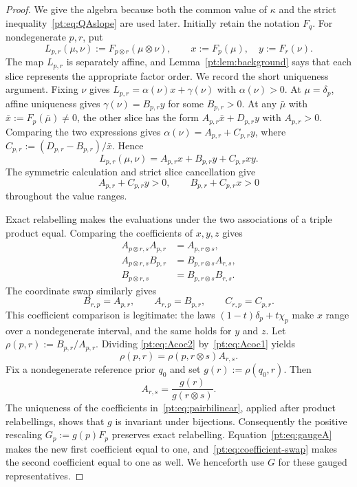 \begin{proof}
We give the algebra because both the common value of $\kappa$ and the strict
inequality~\eqref{pt:eq:QAslope} are used later.  Initially retain the notation
$F_q$.  For nondegenerate $p,r$, put
\[
 L_{p,r}(\mu,\nu):=F_{p\otimes r}(\mu\otimes\nu),
 \qquad x:=F_p(\mu),\quad y:=F_r(\nu).
\]
The map $L_{p,r}$ is separately affine, and
Lemma~\ref{pt:lem:background} says that each slice represents the appropriate
factor order.  We record the short uniqueness argument.  Fixing $\nu$ gives
$L_{p,r}=\alpha(\nu)x+\gamma(\nu)$ with $\alpha(\nu)>0$.  At
$\mu=\delta_p$, affine uniqueness gives
$\gamma(\nu)=B_{p,r}y$ for some $B_{p,r}>0$.  At any $\bar\mu$ with
$\bar x:=F_p(\bar\mu)\ne0$, the other slice has the form
$A_{p,r}\bar x+D_{p,r}y$ with $A_{p,r}>0$.  Comparing the two expressions
gives $\alpha(\nu)=A_{p,r}+C_{p,r}y$, where
$C_{p,r}:=(D_{p,r}-B_{p,r})/\bar x$.  Hence
\begin{equation}
 L_{p,r}(\mu,\nu)
 =A_{p,r}x+B_{p,r}y+C_{p,r}xy.
\label{pt:eq:pairbilinear}
\end{equation}
The symmetric calculation and strict slice cancellation give
\begin{equation}
 A_{p,r}+C_{p,r}y>0,
 \qquad B_{p,r}+C_{p,r}x>0
\label{pt:eq:pair-slopes}
\end{equation}
throughout the value ranges.

Exact relabelling makes the evaluations under the two associations of a
triple product equal.  Comparing the coefficients of $x,y,z$ gives
\begin{align}
 A_{p\otimes r,s}A_{p,r}&=A_{p,r\otimes s},\label{pt:eq:Acoc1}\\
 A_{p\otimes r,s}B_{p,r}&=B_{p,r\otimes s}A_{r,s},\label{pt:eq:Acoc2}\\
 B_{p\otimes r,s}&=B_{p,r\otimes s}B_{r,s}.
\label{pt:eq:Acoc3}
\end{align}
The coordinate swap similarly gives
\[
 B_{r,p}=A_{p,r},\qquad A_{r,p}=B_{p,r},\qquad C_{r,p}=C_{p,r}.
\tag{SW}\label{pt:eq:coefficient-swap}
\]
This coefficient comparison is legitimate: the laws
$(1-t)\delta_p+t\chi_p$ make $x$ range over a nondegenerate interval, and
the same holds for $y$ and $z$.
Let $\rho(p,r):=B_{p,r}/A_{p,r}$.  Dividing
\eqref{pt:eq:Acoc2} by~\eqref{pt:eq:Acoc1} yields
\[
 \rho(p,r)=\rho(p,r\otimes s)A_{r,s}.
\]
Fix a nondegenerate reference prior $q_0$ and set
$g(r):=\rho(q_0,r)$.  Then
\begin{equation}
 A_{r,s}=\frac{g(r)}{g(r\otimes s)}.
\label{pt:eq:gaugeA}
\end{equation}
The uniqueness of the coefficients in~\eqref{pt:eq:pairbilinear}, applied
after product relabellings, shows that $g$ is invariant under bijections.
Consequently the positive rescaling $G_p:=g(p)F_p$ preserves exact
relabelling.  Equation~\eqref{pt:eq:gaugeA} makes the new first coefficient
equal to one, and~\eqref{pt:eq:coefficient-swap} makes the second coefficient
equal to one as well.  We henceforth use $G$ for these gauged representatives.


\end{proof}
